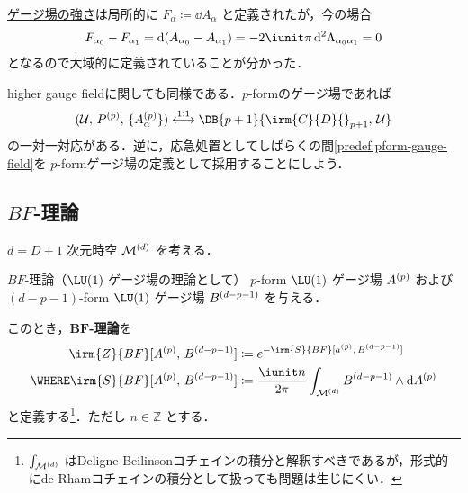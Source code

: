 \documentclass[TQFT_main]{subfiles}
\begin{document}
\hyperref[def:field-strength]{ゲージ場の強さ}は局所的に $F_{\alpha} \coloneqq \dd{A_\alpha}$ と定義されたが，今の場合
\begin{align}
    F_{\alpha_0} - F_{\alpha_1} = \dd{(A_{\alpha_0} - A_{\alpha_1})} = -2\iunit \pi \dd[2]{\Lambda_{\alpha_0\alpha_1}} = 0
\end{align}
となるので大域的に定義されていることが分かった．


higher gauge fieldに関しても同様である．$p$-formのゲージ場であれば
\begin{align}
    \label{predef:pform-gauge-field}
    (\mathcal{U},\, P^{(p)},\, \{A^{(p)}_\alpha\}) \overset{1:1}{\longleftrightarrow} \DB{p+1}{\irm{C}{D}{}_{p+1},\, \mathcal{U}}
\end{align}
の一対一対応がある．逆に，応急処置としてしばらくの間\eqref{predef:pform-gauge-field}を $p$-formゲージ場の定義として採用することにしよう．

\subsection{$BF$-理論}

$d = D+1$ 次元時空 $\mathcal{M}^{(d)}$ を考える．

\begin{mydef}[label=def:BF]{$BF$-理論（$\LU(1)$ ゲージ場の理論として）}
    $p$-form $\LU (1)$ ゲージ場 $A^{(p)}$ および $(d-p-1)$-form $\LU (1)$ ゲージ場 $B^{(d-p-1)}$ を与える．

    このとき，\textbf{$\bm{BF}$-理論}を
    \begin{align}
        \irm{Z}{BF}[\hg{A}{p},\, \hg{B}{d-p-1}] &\coloneqq e^{-\irm{S}{BF}[\hg{a}{p},\, \hg{B}{d-p-1}]} \\
        \WHERE \irm{S}{BF}[\hg{A}{p},\, \hg{B}{d-p-1}] &\coloneqq \frac{\iunit n}{2\pi} \int_{\mfdcal{M}{d}} \hg{B}{d-p-1} \wedge \dd{\hg{A}{p}}
    \end{align}
    と定義する\footnote{$\int_{\mathcal{M}^{(d)}}$ はDeligne-Beilinsonコチェインの積分と解釈すべきであるが，形式的にde Rhamコチェインの積分として扱っても問題は生じにくい．}．ただし $n \in \mathbb{Z}$ とする．
\end{mydef}
\end{document}

